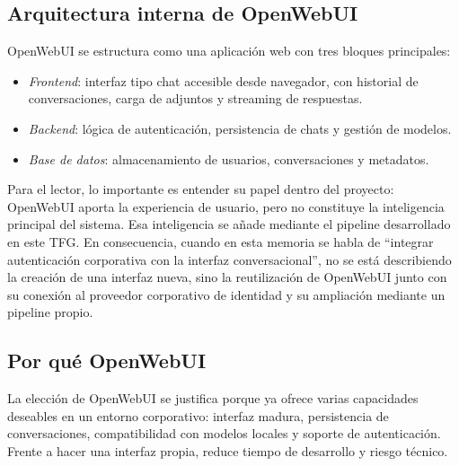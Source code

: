 \subsection{Arquitectura interna de OpenWebUI}

OpenWebUI se estructura como una aplicación web con tres bloques principales:

\begin{itemize}
    \item \textit{Frontend}: interfaz tipo chat accesible desde navegador, con historial de conversaciones, carga de adjuntos y streaming de respuestas.
    \item \textit{Backend}: lógica de autenticación, persistencia de chats y gestión de modelos.
    \item \textit{Base de datos}: almacenamiento de usuarios, conversaciones y metadatos.
\end{itemize}

Para el lector, lo importante es entender su papel dentro del proyecto: OpenWebUI aporta la experiencia de usuario, pero no constituye la inteligencia principal del sistema. Esa inteligencia se añade mediante el pipeline desarrollado en este TFG. En consecuencia, cuando en esta memoria se habla de ``integrar autenticación corporativa con la interfaz conversacional'', no se está describiendo la creación de una interfaz nueva, sino la reutilización de OpenWebUI junto con su conexión al proveedor corporativo de identidad y su ampliación mediante un pipeline propio.

\subsection{Por qué OpenWebUI}

La elección de OpenWebUI se justifica porque ya ofrece varias capacidades deseables en un entorno corporativo: interfaz madura, persistencia de conversaciones, compatibilidad con modelos locales y soporte de autenticación. Frente a hacer una interfaz propia, reduce tiempo de desarrollo y riesgo técnico.

